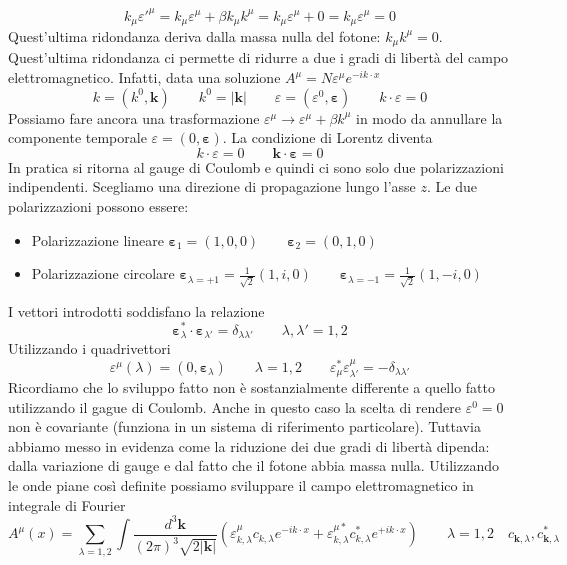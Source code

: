 $$
k_\mu \varepsilon'^\mu = k_\mu \varepsilon^\mu + \beta k_\mu k^\mu = k_\mu \varepsilon^\mu + 0 = k_\mu \varepsilon^\mu = 0
$$
Quest'ultima ridondanza deriva dalla massa nulla del fotone: $k_\mu k^\mu=0$. Quest'ultima ridondanza ci permette di ridurre a due i gradi di libertà del campo elettromagnetico. Infatti, data una soluzione $A^\mu=N\varepsilon^\mu e^{-ik\cdot x}$
$$
k = (k^0, \mathbf{k}) \qquad k^0 = |\mathbf{k}| \qquad \varepsilon = (\varepsilon^0, \boldsymbol{\varepsilon}) \qquad k \cdot \varepsilon = 0
$$
Possiamo fare ancora una trasformazione $\varepsilon^\mu\to\varepsilon^\mu+\beta k^\mu$ in modo da annullare la componente temporale $\varepsilon=(0,\boldsymbol{\varepsilon})$. La condizione di Lorentz diventa
$$
k \cdot \varepsilon = 0 \qquad \mathbf{k} \cdot \boldsymbol{\varepsilon} = 0
$$
In pratica si ritorna al gauge di Coulomb e quindi ci sono solo due polarizzazioni indipendenti. Scegliamo una direzione di propagazione lungo l'asse $z$. Le due polarizzazioni possono essere:
\begin{itemize}
    \item Polarizzazione lineare $\boldsymbol{\varepsilon}_1 = (1, 0, 0) \qquad \boldsymbol{\varepsilon}_2 = (0, 1, 0)$
    \item Polarizzazione circolare $\boldsymbol{\varepsilon}_{\lambda=+1} = \frac{1}{\sqrt{2}}(1, i, 0) \qquad \boldsymbol{\varepsilon}_{\lambda=-1} = \frac{1}{\sqrt{2}}(1, -i, 0)$
\end{itemize}
I vettori introdotti soddisfano la relazione 
$$
\boldsymbol{\varepsilon}_\lambda^* \cdot \boldsymbol{\varepsilon}_{\lambda'} = \delta_{\lambda\lambda'} \qquad \lambda, \lambda' = 1, 2
$$
Utilizzando i quadrivettori
$$
\varepsilon^\mu(\lambda) = (0, \boldsymbol{\varepsilon}_\lambda) \qquad \lambda = 1, 2 \qquad \varepsilon_{\mu}^* \varepsilon^\mu_{\lambda'} = - \delta_{\lambda\lambda'}
$$
Ricordiamo che lo sviluppo fatto non è sostanzialmente differente a quello fatto utilizzando il gague di Coulomb. Anche in questo caso la scelta di rendere $\varepsilon^0=0$ non è covariante (funziona in un sistema di riferimento particolare). Tuttavia abbiamo messo in evidenza come la riduzione dei due gradi di libertà dipenda: dalla variazione di gauge e dal fatto che il fotone abbia massa nulla. Utilizzando le onde piane così definite possiamo sviluppare il campo elettromagnetico in integrale di Fourier
$$
A^\mu(x) = \sum_{\lambda=1,2} \int \frac{d^3\mathbf{k}}{(2\pi)^3 \sqrt{2|\mathbf{k}|}} \left( \varepsilon^\mu_{k,\lambda} c_{k,\lambda} e^{-ik\cdot x} + \varepsilon^{\mu *}_{k,\lambda} c^*_{k,\lambda} e^{+ik\cdot x} \right) \qquad 
\lambda = 1,2 \quad c_{\mathbf{k},\lambda}, c^*_{\mathbf{k},\lambda}
$$
